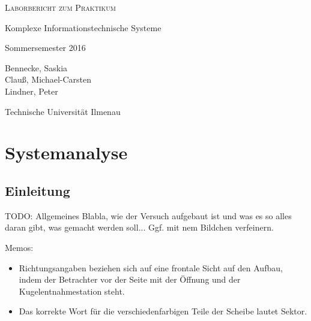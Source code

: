 \documentclass[11pt,a4paper]{scrartcl}
\begin{document}
\begin{fullsizetitle}
	\centering
	\vspace*{8cm}
	\Huge
	\scshape
	Laborbericht zum Praktikum\par
	\Large
	Komplexe Informationstechnische Systeme\par
	\vspace*{.5cm}
	\large
	Sommersemester 2016\par
	\vspace*{2cm}
	\normalfont\normalsize
	Bennecke, Saskia\\
	Clauß, Michael-Carsten\\
	Lindner, Peter\par
	\vspace*{5cm}
	Technische Universität Ilmenau
\end{fullsizetitle}
\section{Systemanalyse}
\subsection{Einleitung}
TODO: Allgemeines Blabla, wie der Versuch aufgebaut ist und was es so alles daran gibt, was gemacht werden soll... Ggf. mit nem Bildchen verfeinern.
\par %
Memos:
\begin{itemize}
	\item Richtungsangaben beziehen sich auf eine frontale Sicht auf den Aufbau, indem der Betrachter vor der Seite mit der Öffnung und der Kugelentnahmestation steht.
	\item Das korrekte Wort für die verschiedenfarbigen Teile der Scheibe lautet \glqq Sektor\grqq.
\end{itemize}
\end{document}
